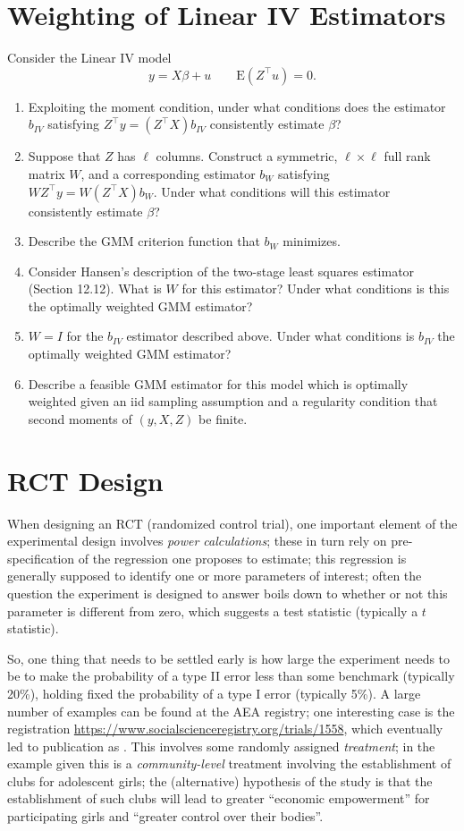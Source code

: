 \documentclass[12pt]{amsart}
\newcommand{\T}{\top}
\newcommand{\E}{\ensuremath{\mbox{E}}}
\begin{document}
\section{Weighting of Linear IV Estimators}
\label{sec:org24885f7}
Consider the Linear IV model
\[
      y = X\beta + u\qquad \E(Z^\T u)=0.
  \]
\begin{enumerate}
\item Exploiting the moment condition, under what conditions does the
estimator \(b_{IV}\) satisfying \(Z^\T y = (Z^\T X)b_{IV}\)
consistently estimate \(\beta\)?
\item Suppose that \(Z\) has \(\ell\) columns.  Construct a symmetric,
\(\ell\times\ell\) full rank matrix \(W\), and a corresponding estimator \(b_W\)
satisfying \(WZ^\T y = W(Z^\T X)b_{W}\).  Under what conditions
will this estimator consistently estimate \(\beta\)?
\item Describe the GMM criterion function that \(b_W\) minimizes.
\item Consider Hansen's description of the two-stage least squares
estimator (Section 12.12).  What is \(W\) for this estimator?
Under what conditions is this the optimally weighted GMM estimator?
\item \(W=I\) for the \(b_{IV}\) estimator described above.  Under what
conditions is \(b_{IV}\) the optimally weighted GMM estimator?
\item Describe a feasible GMM estimator for this model which is
optimally weighted given an iid sampling assumption and a
regularity condition that second moments of \((y,X,Z)\) be finite.
\end{enumerate}

\section{RCT Design}
\label{sec:org22040ac}
When designing an RCT (randomized control trial), one important
element of the experimental design involves \emph{power calculations};
these in turn rely on pre-specification of the regression one
proposes to estimate; this regression is generally supposed to
identify one or more parameters of interest; often the question the
experiment is designed to answer boils down to whether or not this
parameter is different from zero, which suggests a test statistic
(typically a \(t\) statistic).

So, one thing that needs to be settled early is how large the
experiment needs to be to make the probability of a type II error
less than some benchmark (typically 20\%), holding fixed the
probability of a type I error (typically 5\%).  A large number of
examples can be found at the AEA registry; one interesting case is the
registration \url{https://www.socialscienceregistry.org/trials/1558},
which eventually led to publication as \cite{bandiera-etal20}.  This
involves some randomly assigned \emph{treatment}; in the example given
this is a \emph{community-level} treatment involving the establishment of
clubs for adolescent girls; the (alternative) hypothesis of the
study is that the establishment of such clubs will lead to greater
``economic empowerment'' for participating girls and ``greater control
over their bodies''.
\end{document}
